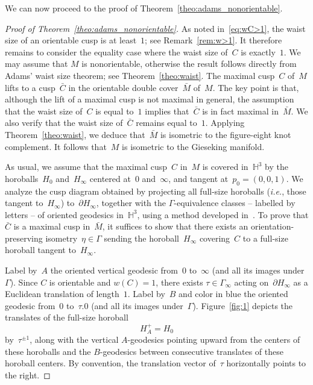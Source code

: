 \documentclass[11pt,reqno]{amsart}
\theoremstyle{definition}
\numberwithin{equation}{section}
\newcommand{\HH}{{\mathbb H}}
\newcommand\ie{{\it i.e.}}
\numberwithin{equation}{section}
\begin{document}
We can now proceed to the proof of Theorem~\ref{theo:adams_nonorientable}.


\begin{proof}[Proof of Theorem~\ref{theo:adams_nonorientable}]
As noted in~\eqref{eq:wC>1}, the waist size of an orientable cusp is at least~$1$; see Remark~\ref{rem:w>1}.
It therefore remains to consider the equality case where the waist size of~$C$ is exactly~$1$.
We may assume that $M$ is nonorientable, otherwise the result follows directly from Adams' waist size theorem; see Theorem~\ref{theo:waist}.
The maximal cusp~$C$ of~$M$ lifts to a cusp~$\bar{C}$ in the orientable double cover~$\bar{M}$ of~$M$.
The key point is that, although the lift of a maximal cusp is not maximal in general, the assumption that the waist size of~$C$ is equal to~$1$ implies that~$\bar{C}$ is in fact maximal in~$\bar{M}$.
We also verify that the waist size of~$\bar{C}$ remains equal to~$1$.
Applying Theorem~\ref{theo:waist}, we deduce that~$\bar{M}$ is isometric to the figure-eight knot complement.
It follows that~$M$ is isometric to the Gieseking manifold.

\medskip

As usual, we assume that the maximal cusp~$C$ in~$M$ is covered in~$\HH^3$ by the horoballs~$H_0$ and~$H_\infty$ centered at~$0$ and~$\infty$, and tangent at~$p_0=(0,0,1)$.
We analyze the cusp diagram obtained by projecting all full-size horoballs (\ie, those tangent to~$H_\infty$) to~$\partial H_\infty$, together with the $\Gamma$-equivalence classes -- labelled by letters -- of oriented geodesics in~$\HH^3$, using a method developed in~\cite{adams_waist}.
To prove that $\bar{C}$ is a maximal cusp in~$\bar{M}$, it suffices to show that there exists an orientation-preserving isometry~$\eta \in \Gamma$ sending the horoball~$H_\infty$ covering~$C$ to a full-size horoball tangent to~$H_\infty$.

\medskip


Label by~$A$ the oriented vertical geodesic from~$0$ to~$\infty$ (and all its images under~$\Gamma$).
Since $C$ is orientable and $w(C)=1$, there exists $\tau \in \Gamma_\infty$ acting on~$\partial H_\infty$ as a Euclidean translation of length~$1$.
Label by~$B$ and color in blue the oriented geodesic from~$0$ to~$\tau.0$ (and all its images under~$\Gamma$).
Figure~\ref{fig:1} depicts the translates of the full-size horoball 
\[
H_A^+=H_0
\]
by~$\tau^{\pm 1}$, along with the vertical $A$-geodesics pointing upward from the centers of these horoballs and the $B$-geodesics between consecutive translates of these horoball centers.
By convention, the translation vector of~$\tau$ horizontally points to the right. 


\end{proof}
\end{document}
